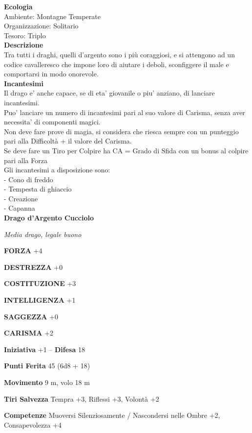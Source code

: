 \begin{multicols}{2}
\textbf{Ecologia}\\
Ambiente: Montagne Temperate\\
Organizzazione: Solitario\\
Tesoro: Triplo\\
\textbf{Descrizione}\\
Tra tutti i draghi, quelli d'argento sono i più coraggiosi, e si attengono ad un codice cavalleresco che impone loro di aiutare i deboli, sconfiggere il male e comportarsi in modo onorevole.\\
\textbf{Incantesimi}\\
Il drago e' anche capace, se di eta' giovanile o piu' anziano, di lanciare incantesimi.\\
Puo' lanciare un numero di incantesimi pari al suo valore di Carisma, senza aver necessita' di componenti magici.\\
Non deve fare prove di magia, si considera che riesca sempre con un punteggio pari alla Difficoltà + il valore del Carisma.\\
Se deve fare un Tiro per Colpire ha CA = Grado di Sfida con un bonus al colpire pari alla Forza\\
Gli incantesimi a disposizione sono:\\
- Cono di freddo\\
- Tempesta di ghiaccio\\
- Creazione\\
- Capanna\\

\medskip{}\textbf{Drago d'Argento Cucciolo}

\emph{Media drago, legale buono}

\textbf{FORZA} +4

\textbf{DESTREZZA} +0

\textbf{COSTITUZIONE} +3

\textbf{INTELLIGENZA} +1

\textbf{SAGGEZZA} +0

\textbf{CARISMA} +2

\textbf{Iniziativa} +1 -- \textbf{Difesa} 18

\textbf{Punti Ferita} 45 (6d8 + 18)

\textbf{Movimento} 9 m, volo 18 m

\textbf{Tiri Salvezza} Tempra +3, Riflessi +3, Volontà +2

\textbf{Competenze} Muoversi Silenziosamente / Nascondersi nelle Ombre +2, Consapevolezza +4


\end{multicols}
